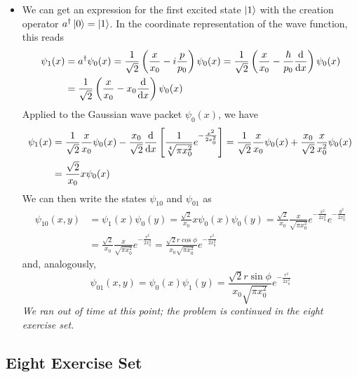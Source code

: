 \documentclass[11pt, a4paper]{article}
\begin{document}
\begin{itemize}
	\item We can get an expression for the first excited state $ \ket{1} $ with the creation operator $ a^{\dagger}\ket{0} = \ket{1} $. In the coordinate representation of the wave function, this reads
	\begin{align*}
		\psi_{1}(x) &= a^{\dagger}\psi_{0}(x) = \frac{1}{\sqrt{2}}\left(\frac{x}{x_{0}}-i\frac{p}{p_{0}}\right)\psi_{0}(x)  = \frac{1}{\sqrt{2}}\left(\frac{x}{x_{0}}-\frac{\hbar}{p_{0}}\dv{x}\right)\psi_{0}(x) \\
		& = \frac{1}{\sqrt{2}}\left(\frac{x}{x_{0}}-x_{0}\dv{x}\right)\psi_{0}(x)
	\end{align*}
	Applied to the Gaussian wave packet $ \psi_{0}(x) $, we have
	\begin{align*}
		\psi_{1}(x) &= \frac{1}{\sqrt{2}}\frac{x}{x_{0}}\psi_{0}(x) - \frac{x_{0}}{\sqrt{2}}\dv{x}\left[\frac{1}{\sqrt[4]{\pi x_{0}^{2}}}e^{-\frac{x^{2}}{2x_{0}^{2}}}\right] = \frac{1}{\sqrt{2}}\frac{x}{x_{0}}\psi_{0}(x) + \frac{x_{0}}{\sqrt{2}}\frac{x}{x_{0}^{2}}\psi_{0}(x)\\
		&=\frac{\sqrt{2}}{x_{0}}x\psi_{0}(x)
	\end{align*}
	We can then write the states $ \psi_{10} $ and $ \psi_{01} $ as
	\begin{align*}
		\psi_{10}(x, y) &= \psi_{1}(x)\psi_{0}(y) = \frac{\sqrt{2}}{x_{0}}x\psi_{0}(x)\psi_{0}(y) = \frac{\sqrt{2}}{x_{0}} \frac{x}{\sqrt{\pi x_{0}^{2}}}e^{-\frac{x^{2}}{2x_{0}^{2}}} e^{-\frac{y^{2}}{2x_{0}^{2}}}\\
		&=\frac{\sqrt{2}}{x_{0}}\frac{x}{\sqrt{\pi x_{0}^{2}}} e^{-\frac{r^{2}}{2x_{0}^{2}}} = \frac{\sqrt{2}r \cos \phi}{x_{0}\sqrt{\pi x_{0}^{2}}}e^{-\frac{r^{2}}{2x_{0}^{2}}}
	\end{align*}
	and, analogously, 
	\begin{equation*}
		\psi_{01}(x, y) = \psi_{0}(x)\psi_{1}(y) = \frac{\sqrt{2}r \sin \phi}{x_{0}\sqrt{\pi x_{0}^{2}}}e^{-\frac{r^{2}}{2x_{0}^{2}}}
	\end{equation*}
	\textit{We ran out of time at this point; the problem is continued in the eight exercise set.}
	
\end{itemize}

\subsection{Eight Exercise Set}
\end{document}
